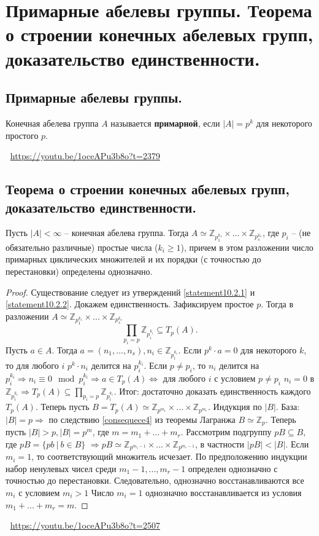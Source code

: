 \section{Примарные абелевы группы. Теорема о строении конечных абелевых групп, доказательство единственности.}

\subsection{Примарные абелевы группы.}
\begin{definition}
    Конечная абелева группа $A$ называется \textbf{примарной}, если $|A| = p^k$ для некоторого простого $p$.
\end{definition}
\large \faYoutube \normalsize $\>$ \url{https://youtu.be/1oceAPu3b8o?t=2379}

\subsection{Теорема о строении конечных абелевых групп, доказательство единственности.}
\begin{theorem}
    Пусть $|A| < \infty$ -- конечная абелева группа. Тогда $A \simeq \mathbb{Z}_{p_1^{k_1}} \times ... \times \mathbb{Z}_{p_s^{k_s}}$, где $p_i$ -- (не обязательно различные) простые числа ($k_i \geqslant 1$), причем в этом разложении число  примарных циклических множителей и их порядки (с точностью до перестановки) определены однозначно.
    \begin{proof}
        Существование следует из утверждений \ref{statement10.2.1} и \ref{statement10.2.2}. Докажем единственность. Зафиксируем простое $p$. Тогда в разложении $A \simeq \mathbb{Z}_{p_1^{k_1}} \times ... \times \mathbb{Z}_{p_s^{k_s}}$
        \[
            \prod_{p_i = p} \mathbb{Z}_{p_i^{k_i}} \subseteq T_p(A).
        \]
        Пусть $a \in A$. Тогда $a = (n_1, ..., n_s), n_i \in \mathbb{Z}_{p_i^{k_i}}$. Если $p^k \cdot a = 0$ для некоторого $k$, то для любого $i$ $p^{k} \cdot n_i$ делится на $p_i^{k_i}$. Если $p \neq p_i$, то $n_i$ делится на $p_i^{k_i} \Rightarrow n_i \equiv 0 \mod p_i^{k_i} \Rightarrow a \in T_p(A) \Leftrightarrow $ для любого $i$ с условием $p \neq p_i$ $n_i = 0$ в $\mathbb{Z}_{p_i^{k_i}} \Rightarrow T_p(A) \subseteq \prod_{p_i = p} \mathbb{Z}_{p_i^{k_i}}$. Итог: достаточно доказать единственность каждого $T_p(A)$.
        Теперь пусть $B = T_p(A) \simeq \mathbb{Z}_{p^{m_1}} \times ... \times \mathbb{Z}_{p^{m_r}}$. Индукция по $|B|$. База: $|B| = p \Rightarrow $ по следствию \ref{consequece4} из теоремы Лагранжа $B \simeq \mathbb{Z}_p$. Теперь пусть $|B| > p, |B| = p^m$, где $m = m_1 + ... + m_r$. Рассмотрим подгруппу $pB \subseteq B$, где $pB = \{ pb \> | \> b \in B \}$ $\Rightarrow pB \simeq \mathbb{Z}_{p^{m_1 - 1}} \times ... \times \mathbb{Z}_{p^{m_r - 1}}$, в частности $|pB| < |B|$. Если $m_i = 1$, то соответствующий множитель исчезает. По предположению индукции набор ненулевых чисел среди $m_1-1, ..., m_r - 1$ определен однозначно с точностью до перестановки. Следовательно, однозначно восстанавливаются все $m_i$ с условием $m_i > 1$ Число $m_i = 1$ однозначно восстанавливается из условия $m_1 + ... + m_r = m$.
    \end{proof}
\end{theorem}
\large \faYoutube \normalsize $\>$ \url{https://youtu.be/1oceAPu3b8o?t=2507}